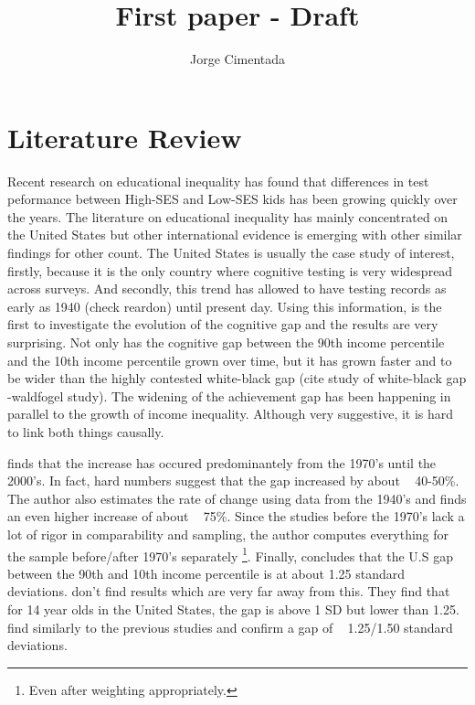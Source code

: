 \documentclass[11pt, a4paper]{article}\usepackage[]{graphicx}\usepackage[]{color}
\title{First paper - Draft}
\author{Jorge Cimentada}
\begin{document}
\setlength{\parindent}{2em}
\setlength{\parskip}{1em}

\maketitle





\tableofcontents












\section{Literature Review}

Recent research on educational inequality has found that differences in test peformance between High-SES and Low-SES kids has been growing quickly over the years. The literature on educational inequality has mainly concentrated on the United States \citep{reardon2011} but other international evidence is emerging with other similar findings for other count. The United States is usually the case study of interest, firstly, because it is the only country where cognitive testing is very widespread across surveys. And secondly, this trend has allowed to have testing records as early as 1940 (check reardon) until present day. Using this information, \citep{reardon2011} is the first to investigate the evolution of the cognitive gap and the results are very surprising. Not only has the cognitive gap between the 90th income percentile and the 10th income percentile grown over time, but it has grown faster and to be wider than the highly contested white-black gap (cite study of white-black gap -waldfogel study). The widening of the achievement gap has been happening in parallel to the growth of income inequality. Although very suggestive, it is hard to link both things causally.

\citet{reardon2011} finds that the increase has occured predominantely from the 1970's until the 2000's. In fact, hard numbers suggest that the gap increased by about ~ 40-50\%. The author also estimates the rate of change using data from the 1940's and finds an even higher increase of about ~ 75\%. Since the studies before the 1970's lack a lot of rigor in comparability and sampling, the author computes everything for the sample before/after 1970's separately \footnote{Even after weighting appropriately.}. Finally, \citet{reardon2011} concludes that the U.S gap between the 90th and 10th income percentile is at about 1.25 standard deviations.  \citet{bradbury2015} don't find results which are very far away from this. They find that for 14 year olds in the United States, the gap is above 1 SD but lower than 1.25. \citet{duncan2011} find similarly to the previous studies and confirm a gap of ~ 1.25/1.50 standard deviations.
\end{document}
